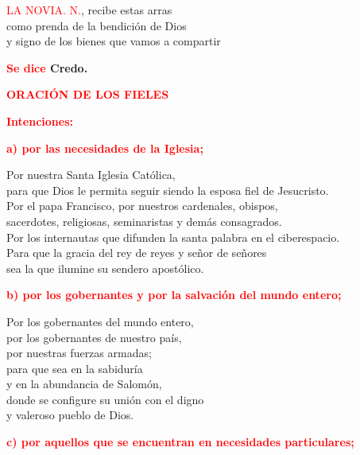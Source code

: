 \documentclass[12pt, letterpaper, spanish]{report}
\begin{document}
\textcolor{red}{LA NOVIA.} \newline
\textcolor{red}{N.}, recibe estas arras \\
como prenda de la bendici\'on de Dios \\
y signo de los bienes que vamos a compartir \newline

\Large {\bfseries \textcolor{red}{Se dice} Credo.} \newline

\newpage

\Large {\bfseries \textcolor{red}{ORACI\'ON DE LOS FIELES}} \newline

\large {\bfseries \textcolor{red}{Intenciones:}} \newline

\large {\bfseries \textcolor{red}{a) por las necesidades de la Iglesia;}} \newline

\Large Por nuestra Santa Iglesia Cat\'olica,\\
para que Dios le permita seguir siendo la esposa fiel de Jesucristo.\\
Por el papa Francisco, por nuestros cardenales, obispos, \\
sacerdotes, religiosas, seminaristas y dem\'as consagrados. \\
Por los internautas que difunden la santa palabra en el ciberespacio.\\
Para que la gracia del rey de reyes y se\~nor de se\~nores \\
sea la que ilumine su sendero apost\'olico.\newline

\large {\bfseries \textcolor{red}{b) por los gobernantes y por la salvaci\'on del mundo entero;}} \newline

\Large Por los gobernantes del mundo entero, \\
por los gobernantes de nuestro pa\'is, \\
por nuestras fuerzas armadas; \\
para que sea en la sabidur\'ia \\
y en la abundancia de Salom\'on, \\
donde se configure su uni\'on con el digno \\
y valeroso pueblo de Dios.\newline

\large {\bfseries \textcolor{red}{c) por aquellos que se encuentran en necesidades particulares;}} \newline
\end{document}
